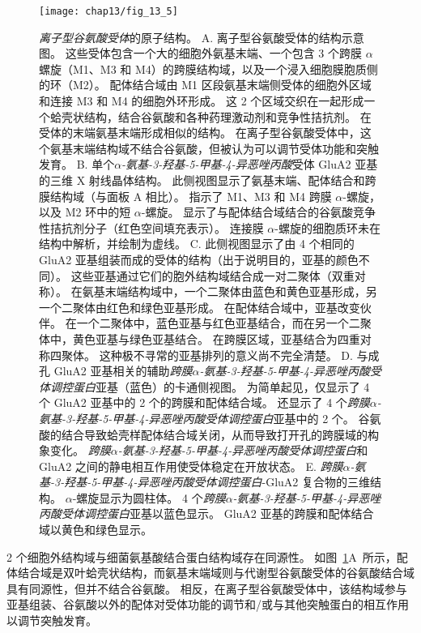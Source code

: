 \begin{figure}[htbp]
	\centering
	\texttt{[image: chap13/fig\_13\_5]}
	\caption{\textit{离子型谷氨酸受体}的原子结构。
		A. 离子型谷氨酸受体的结构示意图。 
		这些受体包含一个大的细胞外氨基末端、一个包含 3 个跨膜 $\alpha$螺旋（M1、M3 和 M4）的跨膜结构域，以及一个浸入细胞膜胞质侧的环（M2）。
		配体结合域由 M1 区段氨基末端侧受体的细胞外区域和连接 M3 和 M4 的细胞外环形成。
		这 2 个区域交织在一起形成一个蛤壳状结构，结合谷氨酸和各种药理激动剂和竞争性拮抗剂。
		在受体的末端氨基末端形成相似的结构。
		在离子型谷氨酸受体中，这个氨基末端结构域不结合谷氨酸，但被认为可以调节受体功能和突触发育\cite{armstrong1998structure}。
		B. 单个\textit{$\alpha$-氨基-3-羟基-5-甲基-4-异恶唑丙酸}受体 GluA2 亚基的三维 X 射线晶体结构。
		此侧视图显示了氨基末端、配体结合和跨膜结构域（与面板 A 相比）。
		指示了 M1、M3 和 M4 跨膜 $\alpha$-螺旋，以及 M2 环中的短 $\alpha$-螺旋。
		显示了与配体结合域结合的谷氨酸竞争性拮抗剂分子（红色空间填充表示）。
		连接膜 $\alpha$-螺旋的细胞质环未在结构中解析，并绘制为虚线\cite{sobolevsky2009x}。
		C. 此侧视图显示了由 4 个相同的 GluA2 亚基组装而成的受体的结构（出于说明目的，亚基的颜色不同）。
		这些亚基通过它们的胞外结构域结合成一对二聚体（双重对称）。
		在氨基末端结构域中，一个二聚体由蓝色和黄色亚基形成，另一个二聚体由红色和绿色亚基形成。
		在配体结合域中，亚基改变伙伴。
		在一个二聚体中，蓝色亚基与红色亚基结合，而在另一个二聚体中，黄色亚基与绿色亚基结合。
		在跨膜区域，亚基结合为四重对称四聚体。
		这种极不寻常的亚基排列的意义尚不完全清楚\cite{sobolevsky2009x}。
		D. 与成孔 GluA2 亚基相关的辅助\textit{跨膜$\alpha$-氨基-3-羟基-5-甲基-4-异恶唑丙酸受体调控蛋白}亚基（蓝色）的卡通侧视图。
		为简单起见，仅显示了 4 个 GluA2 亚基中的 2 个的跨膜和配体结合域。
		还显示了 4 个\textit{跨膜$\alpha$-氨基-3-羟基-5-甲基-4-异恶唑丙酸受体调控蛋白}亚基中的 2 个。
		谷氨酸的结合导致蛤壳样配体结合域关闭，从而导致打开孔的跨膜域的构象变化。
		\textit{跨膜$\alpha$-氨基-3-羟基-5-甲基-4-异恶唑丙酸受体调控蛋白}和 GluA2 之间的静电相互作用使受体稳定在开放状态\cite{mayer2016structural}。 
		E. \textit{跨膜$\alpha$-氨基-3-羟基-5-甲基-4-异恶唑丙酸受体调控蛋白}-GluA2 复合物的三维结构。
		$\alpha$-螺旋显示为圆柱体。
		4 个\textit{跨膜$\alpha$-氨基-3-羟基-5-甲基-4-异恶唑丙酸受体调控蛋白}亚基以蓝色显示。
		GluA2 亚基的跨膜和配体结合域以黄色和绿色显示\cite{mayer2016structural}。}
	\label{fig:13_5}
\end{figure}


2 个细胞外结构域与细菌氨基酸结合蛋白结构域存在同源性。
如图~\ref{fig:13_5}A~所示，配体结合域是双叶蛤壳状结构，而氨基末端域则与代谢型谷氨酸受体的谷氨酸结合域具有同源性，但并不结合谷氨酸。
相反，在离子型谷氨酸受体中，该结构域参与亚基组装、谷氨酸以外的配体对受体功能的调节和/或与其他突触蛋白的相互作用以调节突触发育。


